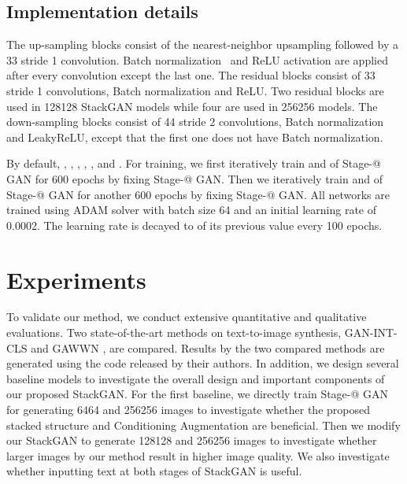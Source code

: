 \documentclass[10pt,twocolumn,letterpaper]{article}
\makeatletter
\newcommand{\Rmnum}[1]{\expandafter\@slowromancap\romannumeral #1@}
\makeatother
\begin{document}
\vspace{-2pt}
\subsection{Implementation details}
\vspace{-5pt}

The up-sampling blocks consist of the nearest-neighbor upsampling followed by a 33 stride 1 convolution. Batch normalization~\cite{IoffeS15} and ReLU activation are applied after every convolution except the last one.  The residual blocks consist of  33 stride 1 convolutions, Batch normalization and ReLU. Two residual blocks are used in 128128 StackGAN models while four are used in 256256 models. The down-sampling blocks consist of 44 stride 2 convolutions, Batch normalization and LeakyReLU, except that the first one does not have Batch normalization.

By default, ,  , ,  , ,   and . 
For training, we first iteratively train  and  of Stage-\Rmnum{1} GAN for 600 epochs by fixing Stage-\Rmnum{2} GAN.
Then we iteratively train  and  of Stage-\Rmnum{2} GAN for another 600 epochs by fixing Stage-\Rmnum{1} GAN. 
All networks are trained using ADAM solver with batch size 64 and an initial learning rate of 0.0002.  
The learning rate is decayed to  of its previous value every 100 epochs. 




\section{Experiments}
\vspace{-5pt}

To validate our method, we conduct extensive quantitative and qualitative evaluations. Two state-of-the-art methods on text-to-image synthesis, GAN-INT-CLS \cite{reed2016generative} and GAWWN \cite{reed2016learning}, are compared. Results by the two compared methods are generated using the code released by their authors. In addition, we design several baseline models to investigate the overall design and important components of our proposed StackGAN. For the first baseline, we directly train Stage-\Rmnum{1} GAN for generating 6464 and 256256 images to investigate whether the proposed stacked structure and Conditioning Augmentation are beneficial. Then we modify our StackGAN to generate 128128 and 256256 images to investigate whether larger images by our method result in higher image quality. We also investigate whether inputting text at both stages of StackGAN is useful. 
\end{document}
